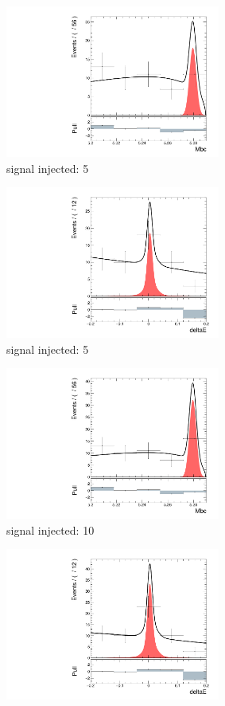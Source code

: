 \begin{figure}[htpb]
	
	\begin{subfigure}{0.5\linewidth}
		\includegraphics[page=1,height=5cm]{figures/injection_sig_5/ds_gen_Mbc_2D.pdf}
		\caption{signal injected: 5}
	\end{subfigure}
	\begin{subfigure}{0.5\linewidth}
		\includegraphics[page=1,height=5cm]{figures/injection_sig_5/ds_gen_deltaE_2D.pdf}
		\caption{signal injected: 5}
	\end{subfigure}
	\begin{subfigure}{0.5\linewidth}
		\includegraphics[page=1,height=5cm]{figures/injection_sig_10/ds_gen_Mbc_2D.pdf}
		\caption{signal injected: 10}
	\end{subfigure}
	\begin{subfigure}{0.5\linewidth}
		\includegraphics[page=1,height=5cm]{figures/injection_sig_10/ds_gen_deltaE_2D.pdf}

\end{subfigure}
\end{figure}
